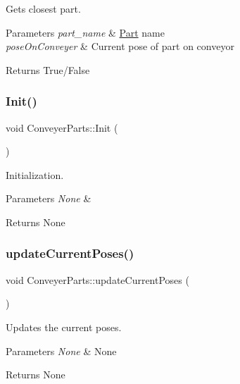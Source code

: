 Gets closest part. 


\begin{DoxyParams}{Parameters}
{\em part\+\_\+name} & \hyperlink{structPart}{Part} name \\
\hline
{\em pose\+On\+Conveyer} & Current pose of part on conveyor \\
\hline
\end{DoxyParams}
\begin{DoxyReturn}{Returns}
True/\+False 
\end{DoxyReturn}
\mbox{\label{classConveyerParts_ab701aac222b631fdf7a1d2a3465eaa67}} 
\subsubsection{\texorpdfstring{Init()}{Init()}}
{\footnotesize\ttfamily void Conveyer\+Parts\+::\+Init (\begin{DoxyParamCaption}{ }\end{DoxyParamCaption})}



Initialization. 


\begin{DoxyParams}{Parameters}
{\em None} & \\
\hline
\end{DoxyParams}
\begin{DoxyReturn}{Returns}
None 
\end{DoxyReturn}
\mbox{\label{classConveyerParts_a46d0279dd64806ce55fad19c84447faa}} 
\subsubsection{\texorpdfstring{update\+Current\+Poses()}{updateCurrentPoses()}}
{\footnotesize\ttfamily void Conveyer\+Parts\+::update\+Current\+Poses (\begin{DoxyParamCaption}{ }\end{DoxyParamCaption})}



Updates the current poses. 


\begin{DoxyParams}{Parameters}
{\em None} & None \\
\hline
\end{DoxyParams}
\begin{DoxyReturn}{Returns}
None 
\end{DoxyReturn}


